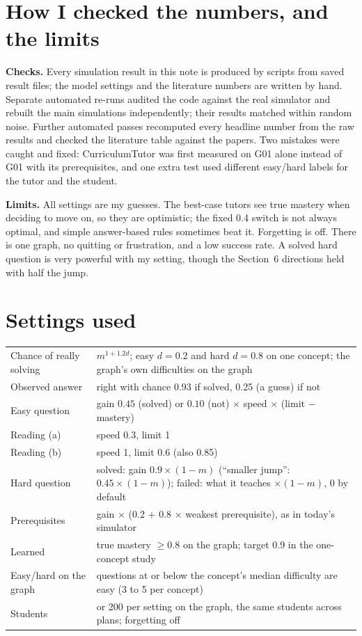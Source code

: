 \documentclass[11pt,a4paper]{article}
\begin{document}
\section{How I checked the numbers, and the limits}
\textbf{Checks.} Every simulation result in this note is produced by scripts from saved result files; the model settings and the literature numbers are written by hand. Separate automated re-runs audited the code against the real simulator and rebuilt the main simulations independently; their results matched within random noise. Further automated passes recomputed every headline number from the raw results and checked the literature table against the papers. Two mistakes were caught and fixed: CurriculumTutor was first measured on G01 alone instead of G01 with its prerequisites, and one extra test used different easy/hard labels for the tutor and the student.

\textbf{Limits.} All settings are my guesses. The best-case tutors see true mastery when deciding to move on, so they are optimistic; the fixed 0.4 switch is not always optimal, and simple answer-based rules sometimes beat it. Forgetting is off. There is one graph, no quitting or frustration, and a low success rate. A solved hard question is very powerful with my setting, though the Section~6 directions held with half the jump.

\appendix
\section{Settings used}
{\small\begin{tabularx}{\linewidth}{>{\raggedright}p{3.6cm}>{\raggedright\arraybackslash}X}
\toprule
Chance of really solving & $m^{1+1.2d}$; easy $d = 0.2$ and hard $d = 0.8$ on one concept; the graph's own difficulties on the graph\\
Observed answer & right with chance 0.93 if solved, 0.25 (a guess) if not\\
Easy question & gain $0.45$ (solved) or $0.10$ (not) $\times$ speed $\times$ (limit $-$ mastery)\\
Reading (a) & speed 0.3, limit 1\\
Reading (b) & speed 1, limit 0.6 (also 0.85)\\
Hard question & solved: gain $0.9\times(1-m)$ (``smaller jump'': $0.45\times(1-m)$); failed: what it teaches $\times(1-m)$, 0 by default\\
Prerequisites & gain $\times$ (0.2 + 0.8 $\times$ weakest prerequisite), as in today's simulator\\
Learned & true mastery $\geq 0.8$ on the graph; target 0.9 in the one-concept study\\
Easy/hard on the graph & questions at or below the concept's median difficulty are easy (3 to 5 per concept)\\
Students & 100 or 200 per setting on the graph, the same students across plans; forgetting off\\
\bottomrule
\end{tabularx}}
\end{document}
